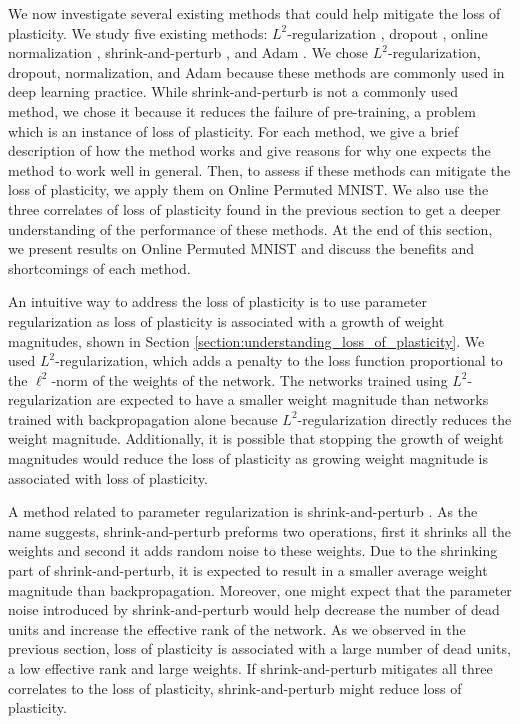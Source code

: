 \documentclass[review, number,3p]{elsarticle}
\begin{document}
We now investigate several existing methods that could help mitigate the loss of plasticity. 
We study five existing methods: $L^2$-regularization \cite[pp.~227--230]{Goodfellow-et-al-2016}, dropout \cite{Hinton2012Dropout1}, online normalization \cite{bjork2018}, shrink-and-perturb \cite{WarmStart2020}, and Adam \cite{kingma2015}.
We chose $L^2$-regularization, dropout, normalization, and Adam because these methods are commonly used in deep learning practice.
While shrink-and-perturb is not a commonly used method, we chose it because it reduces the failure of pre-training, a problem which is an instance of loss of plasticity.
For each method, we give a brief description of how the method works and give reasons for why one expects the method to work well in general.
Then, to assess if these methods can mitigate the loss of plasticity, we apply them on Online Permuted MNIST.
We also use the three correlates of loss of plasticity found in the previous section to get a deeper understanding of the performance of these methods.
At the end of this section, we present results on Online Permuted MNIST and discuss the benefits and shortcomings of each method.

An intuitive way to address the loss of plasticity is to use parameter regularization as loss of plasticity is associated with a growth of weight magnitudes, shown in Section \ref{section:understanding_loss_of_plasticity}. 
We used $L^2$-regularization, which adds a penalty to the loss function proportional to the $\ell^2$-norm of the weights of the network. 
The networks trained using $L^2$-regularization are expected to have a smaller weight magnitude than networks trained with backpropagation alone because $L^2$-regularization directly reduces the weight magnitude.
Additionally, it is possible that stopping the growth of weight magnitudes would reduce the loss of plasticity as growing weight magnitude is associated with loss of plasticity. 

A method related to parameter regularization is shrink-and-perturb \cite{WarmStart2020}.
As the name suggests, shrink-and-perturb preforms two operations, first it shrinks all the weights and second it adds random noise to these weights.
Due to the shrinking part of shrink-and-perturb, it is expected to result in a smaller average weight magnitude than backpropagation.
Moreover, one might expect that the parameter noise introduced by shrink-and-perturb would help decrease the number of dead units and increase the effective rank of the network. 
As we observed in the previous section, loss of plasticity is associated with a large number of dead units, a low effective rank and large weights.
If shrink-and-perturb mitigates all three correlates to the loss of plasticity, shrink-and-perturb might reduce loss of plasticity.
\end{document}
